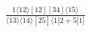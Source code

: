 \documentclass[varwidth, border=5pt]{standalone}
\begin{document}
\begin{my}
$\begin{gathered}
\scriptscriptstyle\frac{1⟨12⟩[12][34]⟨15⟩}{⟨13⟩⟨14⟩[25]⟨1|2+5|1]}
\end{gathered}$
\end{my}
\end{document}
